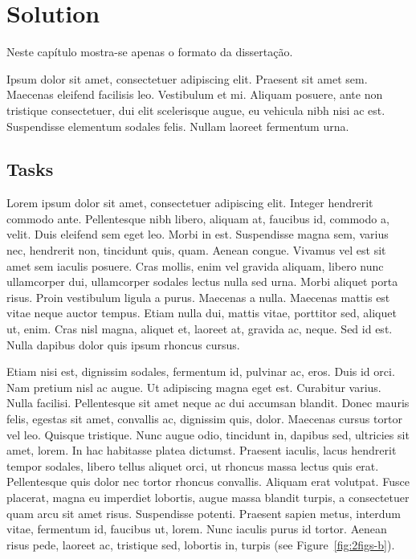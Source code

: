 \chapter{Solution} \label{chap:solution}

Neste capítulo mostra-se apenas o formato da dissertação.

Ipsum dolor sit amet, consectetuer
adipiscing elit.  Praesent sit amet sem. 
Maecenas eleifend facilisis leo. Vestibulum et
mi. Aliquam posuere, ante non tristique consectetuer, dui elit
scelerisque augue, eu vehicula nibh nisi ac est. 
Suspendisse elementum sodales felis. 
Nullam laoreet fermentum urna. 

\section{Tasks} \label{sec:tasks}

Lorem ipsum dolor sit amet, consectetuer adipiscing elit. Integer
hendrerit commodo ante. Pellentesque nibh libero, aliquam at, faucibus
id, commodo a, velit. Duis eleifend sem eget leo. Morbi in
est. Suspendisse magna sem, varius nec, hendrerit non, tincidunt quis,
quam. Aenean congue. Vivamus vel est sit amet sem iaculis
posuere. Cras mollis, enim vel gravida aliquam, libero nunc
ullamcorper dui, ullamcorper sodales lectus nulla sed urna. Morbi
aliquet porta risus. Proin vestibulum ligula a purus. Maecenas a
nulla. Maecenas mattis est vitae neque auctor tempus. Etiam nulla dui,
mattis vitae, porttitor sed, aliquet ut, enim. Cras nisl magna,
aliquet et, laoreet at, gravida ac, neque. Sed id est. Nulla dapibus
dolor quis ipsum rhoncus cursus. 

Etiam nisi est, dignissim sodales, fermentum id, pulvinar ac,
eros. Duis id orci. Nam pretium nisl ac augue. Ut adipiscing magna
eget est. Curabitur varius. Nulla facilisi. Pellentesque sit amet
neque ac dui accumsan blandit. Donec mauris felis, egestas sit amet,
convallis ac, dignissim quis, dolor. Maecenas cursus tortor vel
leo. Quisque tristique. Nunc augue odio, tincidunt in, dapibus sed,
ultricies sit amet, lorem. In hac habitasse platea dictumst. Praesent
iaculis, lacus hendrerit tempor sodales, libero tellus aliquet orci,
ut rhoncus massa lectus quis erat. Pellentesque quis dolor nec tortor
rhoncus convallis. Aliquam erat volutpat. Fusce placerat, magna eu
imperdiet lobortis, augue massa blandit turpis, a consectetuer quam
arcu sit amet risus. Suspendisse potenti. Praesent sapien metus,
interdum vitae, fermentum id, faucibus ut, lorem. Nunc iaculis purus
id tortor. Aenean risus pede, laoreet ac, tristique sed, lobortis in,
turpis (see Figure~\ref{fig:2figs-b}). 

